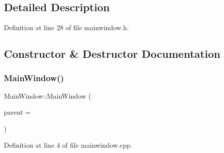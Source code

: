 \subsection{Detailed Description}


Definition at line 28 of file mainwindow.\+h.



\subsection{Constructor \& Destructor Documentation}
\mbox{\label{class_main_window_a8b244be8b7b7db1b08de2a2acb9409db}} 
\subsubsection{\texorpdfstring{Main\+Window()}{MainWindow()}}
{\footnotesize\ttfamily Main\+Window\+::\+Main\+Window (\begin{DoxyParamCaption}\item[{Q\+Widget $\ast$}]{parent = {} }\end{DoxyParamCaption})\hspace{0.3cm}{\ttfamily [explicit]}}



Definition at line 4 of file mainwindow.\+cpp.


